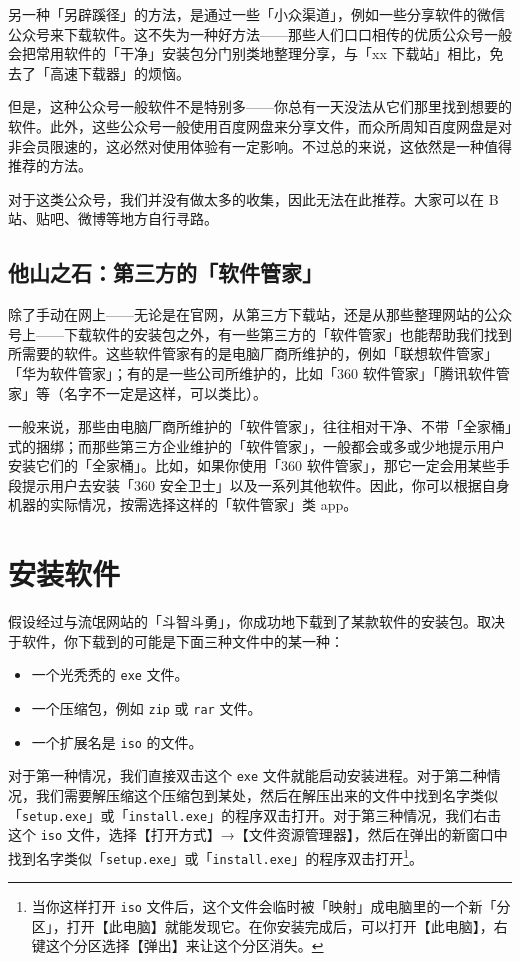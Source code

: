 另一种「另辟蹊径」的方法，是通过一些「小众渠道」，例如一些分享软件的微信公众号来下载软件。这不失为一种好方法——那些人们口口相传的优质公众号一般会把常用软件的「干净」安装包分门别类地整理分享，与「xx 下载站」相比，免去了「高速下载器」的烦恼。

但是，这种公众号一般软件不是特别多——你总有一天没法从它们那里找到想要的软件。此外，这些公众号一般使用百度网盘来分享文件，而众所周知百度网盘是对非会员限速的，这必然对使用体验有一定影响。不过总的来说，这依然是一种值得推荐的方法。

\begin{note}
  对于这类公众号，我们并没有做太多的收集，因此无法在此推荐。大家可以在 B 站、贴吧、微博等地方自行寻路。
\end{note}

\subsection{他山之石：第三方的「软件管家」}

除了手动在网上——无论是在官网，从第三方下载站，还是从那些整理网站的公众号上——下载软件的安装包之外，有一些第三方的「软件管家」也能帮助我们找到所需要的软件。这些软件管家有的是电脑厂商所维护的，例如「联想软件管家」「华为软件管家」；有的是一些公司所维护的，比如「360 软件管家」「腾讯软件管家」等（名字不一定是这样，可以类比）。

一般来说，那些由电脑厂商所维护的「软件管家」，往往相对干净、不带「全家桶」式的捆绑；而那些第三方企业维护的「软件管家」，一般都会或多或少地提示用户安装它们的「全家桶」。比如，如果你使用「360 软件管家」，那它一定会用某些手段提示用户去安装「360 安全卫士」以及一系列其他软件。因此，你可以根据自身机器的实际情况，按需选择这样的「软件管家」类 app。

\section{安装软件}

假设经过与流氓网站的「斗智斗勇」，你成功地下载到了某款软件的安装包。取决于软件，你下载到的可能是下面三种文件中的某一种：

\begin{itemize}
  \item 一个光秃秃的 \verb|exe| 文件。
  \item 一个压缩包，例如 \verb|zip| 或 \verb|rar| 文件。
  \item 一个扩展名是 \verb|iso| 的文件。
\end{itemize}

对于第一种情况，我们直接双击这个 \verb|exe| 文件就能启动安装进程。对于第二种情况，我们需要解压缩这个压缩包到某处，然后在解压出来的文件中找到名字类似「\verb|setup.exe|」或「\verb|install.exe|」的程序双击打开。对于第三种情况，我们右击这个 \verb|iso| 文件，选择【打开方式】→【文件资源管理器】，然后在弹出的新窗口中找到名字类似「\verb|setup.exe|」或「\verb|install.exe|」的程序双击打开\footnote{当你这样打开 \texttt{iso} 文件后，这个文件会临时被「映射」成电脑里的一个新「分区」，打开【此电脑】就能发现它。在你安装完成后，可以打开【此电脑】，右键这个分区选择【弹出】来让这个分区消失。}。

